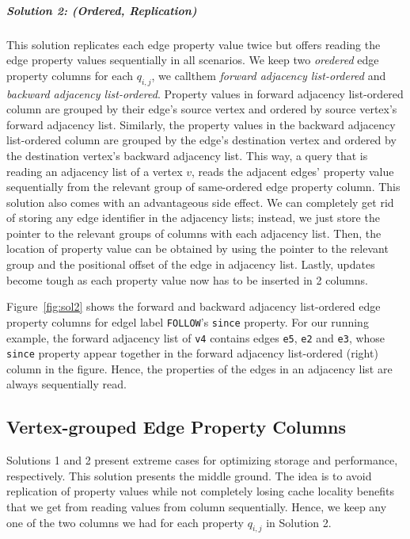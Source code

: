 \subparagraph{Solution 2: (Ordered, Replication) } This solution replicates each edge property value twice but offers reading the edge property values sequentially in all scenarios. We keep two \emph{oredered} edge property columns for each $q_{i,j}$, we callthem \emph{forward adjacency list-ordered} and \emph{backward adjacency list-ordered}. Property values in forward adjacency list-ordered column are grouped by their edge's source vertex and ordered by source vertex's forward adjacency list. Similarly, the property values in the backward adjacency list-ordered column are grouped by the edge's destination vertex and ordered by the destination vertex's backward adjacency list. This way, a query that is reading an adjacency list of a vertex $v$, reads the adjacent edges' property value sequentially from the relevant group of same-ordered edge property column. This solution also comes with an advantageous side effect. We can completely get rid of storing any edge identifier in the adjacency lists; instead, we just store the pointer to the relevant groups of columns with each adjacency list. Then, the location of property value can be obtained by using the pointer to the relevant group and the positional offset of the edge in adjacency list. Lastly, updates become tough as each property value now has to be inserted in 2 columns.

Figure~\ref{fig:sol2} shows the forward and backward adjacency list-ordered edge property columns for edgel label \texttt{FOLLOW}'s \texttt{since} property. For our running example, the forward adjacency list of \texttt{v4} contains edges \texttt{e5}, \texttt{e2} and \texttt{e3}, whose \texttt{since} property appear together in the forward adjacency list-ordered (right) column in the figure. Hence, the properties of the edges in an adjacency list are always sequentially read.

\subsection{Vertex-grouped Edge Property Columns}

Solutions 1 and 2 present extreme cases for optimizing storage and performance, respectively. This solution presents the middle ground. The idea is to avoid replication of property values while not completely losing cache locality benefits that we get from reading values from column sequentially. Hence, we keep any one of the two columns we had for each property $q_{i,j}$ in Solution 2.


